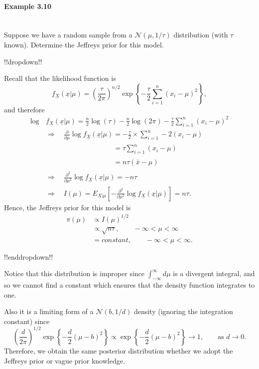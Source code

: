 \clearpage

\paragraph{Example 3.10}{~\\
Suppose we have a random sample from a $\mathcal{N}(\mu,1/\tau)$ distribution \label{ex:39} (with $\tau$ known). Determine the Jeffreys prior for this model.

!!dropdown!!

Recall that the likelihood function is
    $$
    f_{\underline{X}}(\underline{x}|\mu)=
    \left(\frac{\tau}{2\pi}\right)^{n/2}
    \exp\left\{-\frac{\tau}{2}\sum_{i=1}^n (x_i-\mu)^2\right\},
    $$
    and therefore 
    \begin{align*}
    \log\,&f_{\underline{X}}(\underline{x}|\mu)=\frac{n}{2}\log(\tau)-\frac{n}{2}\log(2\pi)
    -\frac{\tau}{2}\sum_{i=1}^n (x_i-\mu)^2 \\
    &\Rightarrow\quad \frac{\partial}{\partial\mu} \log
    f_{\underline{X}}(\underline{x}|\mu)=-\frac{\tau}{2}\times\sum_{i=1}^n -2(x_i-\mu)\\
    &\phantom{\Rightarrow\quad \frac{\partial}{\partial\mu} \log f_{\underline{X}}(\underline{x}|\mu)}
    =\tau\sum_{i=1}^n (x_i-\mu) \\
    &\phantom{\Rightarrow\quad \frac{\partial}{\partial\mu} \log f_{\underline{X}}(\underline{x}|\mu)}
    =n\tau(\bar x-\mu)\\
    &\Rightarrow\quad \frac{\partial^2}{\partial\mu^2} \log
    f_{\underline{X}}(\underline{x}|\mu)=-n\tau\\
    &\Rightarrow\quad I(\mu)=E_{\underline{X}|\mu}
    \left[-\frac{\partial^2}{\partial\mu^2} \log
    f_{\underline{X}}(\underline{x}|\mu)\right]=n\tau.
    \end{align*}
    Hence, the Jeffreys prior for this model is
    \begin{align*}
    \pi(\mu)&\propto I(\mu)^{1/2} \\
    &\propto\sqrt{n\tau},\qquad-\infty<\mu<\infty \\
    &= constant,\qquad-\infty<\mu<\infty. 
    \end{align*}

!!enddropdown!!

Notice that this distribution is improper since $\int_{-\infty}^\infty d\mu$ is a divergent integral, and so we cannot find a constant which ensures that the density function integrates to one.

Also it is a limiting form of a $\mathcal{N}(b,1/d)$ density (ignoring the integration constant) since
\begin{equation*}
\left(\frac{d}{2\pi}\right)^{1/2}\exp\left\{-\frac{d}{2}(\mu-b)^2\right\}
\propto
\exp\left\{-\frac{d}{2}(\mu-b)^2\right\}
\to 1,\quad\quad\text{as }d\to 0.
\end{equation*}
Therefore, we obtain the same posterior distribution whether we adopt
the Jeffreys prior or vague prior knowledge.}

